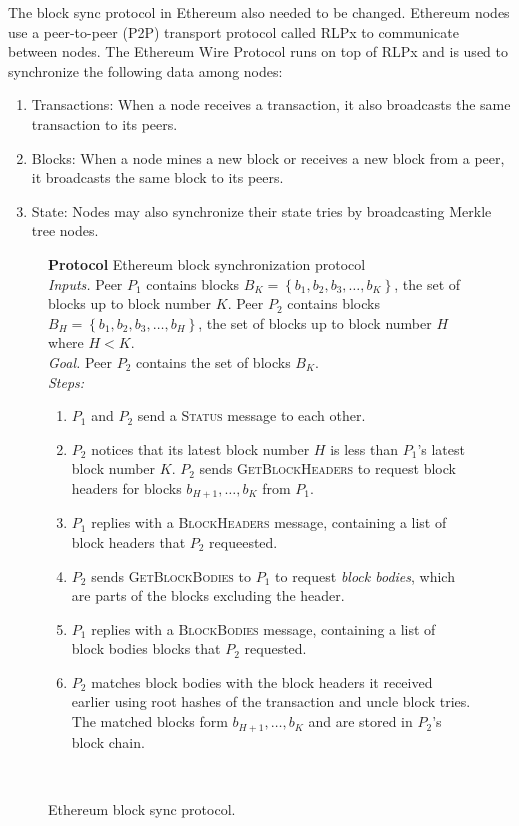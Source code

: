\documentclass[12pt]{article}
\makeatletter
\newcounter{protocol}
\newenvironment{protocol}[1]
  {\par\addvspace{\topsep}
   \noindent
   \tabularx{\linewidth}{@{} X @{}}
    \hline
    \refstepcounter{protocol}\textbf{Protocol \theprotocol} #1 \\
    \hline}
  { \\
    \hline
   \endtabularx
   \par\addvspace{\topsep}}
\newcommand{\sbline}{\\[.5\normalbaselineskip]}%
\newcommand{\set}[1]{\left\{#1\right\}}
\makeatother
\begin{document}
The block sync protocol in Ethereum also needed to be changed. Ethereum nodes use a peer-to-peer (P2P) transport protocol called RLPx to communicate between nodes. The Ethereum Wire Protocol runs on top of RLPx and is used to synchronize the following data among nodes:
\begin{enumerate}
  \item Transactions: When a node receives a transaction, it also broadcasts the same transaction to its peers.
  \item Blocks: When a node mines a new block or receives a new block from a peer, it broadcasts the same block to its peers.
  \item State: Nodes may also synchronize their state tries by broadcasting Merkle tree nodes.
\end{enumerate}


\begin{figure}[H]
  \begin{protocol}{Ethereum block synchronization protocol}
    \emph{Inputs.} Peer $P_1$ contains blocks $B_K = \set{b_{1}, b_{2}, b_{3}, \ldots, b_{K}}$, the set of blocks up to block number $K$. Peer $P_2$ contains blocks $B_H = \set{b_{1}, b_{2}, b_{3}, \ldots, b_{H}}$, the set of blocks up to block number $H$ where $H < K$.
    \sbline
    \emph{Goal.} Peer $P_2$ contains the set of blocks $B_K$.
    \sbline
    \emph{Steps:}
    \begin{enumerate}
      \item $P_1$ and $P_2$ send a \textsc{Status} message to each other.
      \item $P_2$ notices that its latest block number $H$ is less than $P_1$'s latest block number $K$. $P_2$ sends \textsc{GetBlockHeaders} to request block headers for blocks $b_{H + 1}, \ldots, b_{K}$ from $P_1$. \label{syncprotocol:requestBlockHeaders}
      \item $P_1$ replies with a \textsc{BlockHeaders} message, containing a list of block headers that $P_2$ requeested. \label{syncprotocol:replyBlockHeaders}
      \item $P_2$ sends \textsc{GetBlockBodies} to $P_1$ to request \emph{block bodies}, which are parts of the blocks excluding the header. \label{syncprotocol:requestBlockBodies}
      \item $P_1$ replies with a \textsc{BlockBodies} message, containing a list of block bodies blocks that $P_2$ requested. \label{syncprotocol:replyBlockBodies}
      \item $P_2$ matches block bodies with the block headers it received earlier using root hashes of the transaction and uncle block tries. The matched blocks form $b_{H + 1}, \ldots, b_{K}$ and are stored in $P_2$'s block chain. \label{syncprotocol:reconstruct}
    \end{enumerate}
  \end{protocol}
  \caption{Ethereum block sync protocol.} \label{syncprotocol}
\end{figure}
\end{document}
